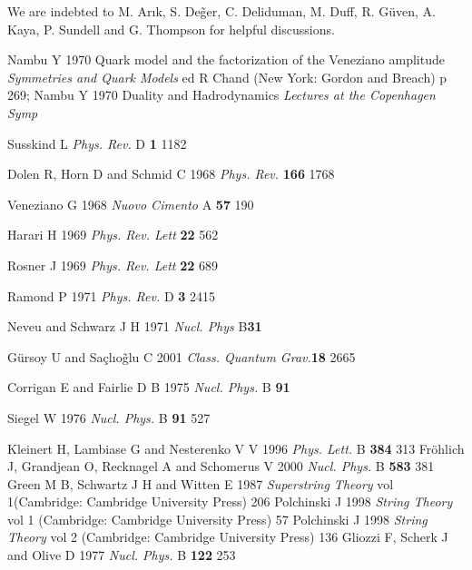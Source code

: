 \documentclass[a4paper,a4paper]{article}
\begin{document}
We are indebted to M. Ar\i k, S. De\~{g}er, C. Deliduman, M. Duff,
R. G\"{u}ven, A. Kaya, P. Sundell and G. Thompson for helpful
discussions. \

\begin{thebibliography}{25}

 Nambu Y 1970 Quark model and the factorization of the
Veneziano amplitude {\it{Symmetries and Quark Models}} ed R Chand (New
York:
Gordon and Breach) p 269; Nambu Y 1970 Duality and Hadrodynamics
{\it{Lectures at the Copenhagen Symp}}

 Susskind L {\it {Phys. Rev.}} D {\bf {1}} 1182

 Dolen R, Horn D and Schmid C 1968  {\it{Phys. Rev.}}
{\bf{166}} 1768

 Veneziano G 1968 {\it{Nuovo Cimento}} A {\bf{57}} 190

 Harari H 1969  {\it{Phys. Rev. Lett}} {\bf{22}} 562

 Rosner J 1969  {\it{Phys. Rev. Lett}} {\bf{22}} 689

 Ramond P 1971  {\it{Phys. Rev.}} D {\bf{3}} 2415

 Neveu and Schwarz J H 1971 {\it{Nucl. Phys}} B{\bf{31}}

 G\"{u}rsoy U and Sa\c{c}l{\i}o\~{g}lu C 2001 {\it{Class.
Quantum Grav.}}{\bf{18}} 2665

 Corrigan E and Fairlie D B 1975 {\it{Nucl. Phys.}} B
{\bf{91}}

 Siegel W 1976 {\it{Nucl. Phys.}} B {\bf{91}} 527

 Kleinert H, Lambiase G and Nesterenko V V 1996 {\it{Phys.
Lett.}} B {\bf{384}} 313
 Fr\"{o}hlich J, Grandjean O, Recknagel A and Schomerus V
2000 {\it{Nucl. Phys.}} B {\bf{583}} 381
 Green M B, Schwartz J H and Witten E 1987 {\it{Superstring
Theory}} vol 1(Cambridge: Cambridge University Press) 206
  Polchinski J 1998 {\it{String Theory}} vol 1 (Cambridge:
Cambridge University Press) 57
 Polchinski J 1998 {\it{String Theory}} vol 2 (Cambridge:
Cambridge University Press) 136
 Gliozzi F, Scherk J and Olive D 1977 {\it{Nucl. Phys.}} B
{\bf{122}} 253

\end{thebibliography}
\end{document}
